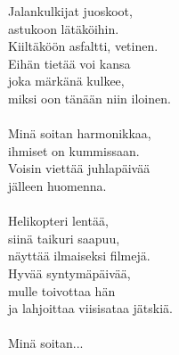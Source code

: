 
            Jalankulkijat juoskoot, \\
            astukoon lätäköihin. \\
            Kiiltäköön asfaltti, vetinen. \\
            Eihän tietää voi kansa \\
            joka märkänä kulkee, \\
            miksi oon tänään niin iloinen. \\
\hspace{10mm} \\
            Minä soitan harmonikkaa, \\
            ihmiset on kummissaan. \\
            Voisin viettää juhlapäivää \\
            jälleen huomenna. \\
\hspace{10mm} \\
            Helikopteri lentää, \\
            siinä taikuri saapuu, \\
            näyttää ilmaiseksi filmejä. \\
            Hyvää syntymäpäivää, \\
            mulle toivottaa hän \\
            ja lahjoittaa viisisataa jätskiä. \\
\hspace{10mm} \\
            Minä soitan... \\

